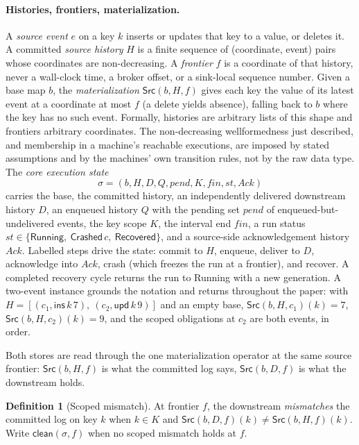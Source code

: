 \documentclass[sigplan,10pt]{acmart}
\theoremstyle{plain}
\theoremstyle{definition}
\newtheorem{definition}{Definition}[section]
\newcommand{\Src}{\mathsf{Src}}            %
\newcommand{\scope}{K}                     %
\newcommand{\fin}{\mathit{fin}}            %
\newcommand{\clean}{\mathsf{clean}}        %
\newcommand{\Running}{\textsf{Running}}
\newcommand{\Crashed}{\textsf{Crashed}}
\newcommand{\Recovered}{\textsf{Recovered}}
\begin{document}
\paragraph{Histories, frontiers, materialization.}
A \emph{source event} $e$ on a key $k$ inserts or updates that key to a
value, or deletes it. A committed \emph{source history} $H$ is a finite
sequence of (coordinate, event) pairs whose coordinates are
non-decreasing. A \emph{frontier} $f$ is a coordinate of that
history, never a wall-clock time, a broker offset, or a sink-local
sequence number. Given a base map $b$, the \emph{materialization}
$\Src(b,H,f)$ gives each key the value of its latest event at a
coordinate at most $f$ (a delete yields absence), falling back to $b$
where the key has no such event. Formally, histories are arbitrary
lists of this shape and frontiers arbitrary coordinates. The
non-decreasing wellformedness just described, and membership in a
machine's reachable executions, are imposed by stated assumptions and by
the machines' own transition rules, not by the raw data type. The
\emph{core execution state}
\[
\sigma = (b, H, D, Q, \mathit{pend}, \scope, \fin, \mathit{st},
\mathit{Ack})
\]
carries the base, the committed history, an independently delivered
downstream history $D$, an enqueued history $Q$ with the pending set
$\mathit{pend}$ of enqueued-but-undelivered events, the key scope
$\scope$, the interval end $\fin$, a run status
$\mathit{st} \in \{\Running,\ \Crashed\,c,\ \Recovered\}$, and a
source-side acknowledgement history $\mathit{Ack}$. Labelled steps
drive the state: commit to $H$, enqueue, deliver to $D$, acknowledge
into $\mathit{Ack}$, crash (which freezes the run at a
frontier), and recover. A completed recovery cycle returns the run to
\Running{} with a new generation. A two-event instance grounds the
notation and returns throughout the paper: with
$H = [(c_1, \mathsf{ins}\,k\,7),\ (c_2, \mathsf{upd}\,k\,9)]$ and an
empty base, $\Src(b,H,c_1)(k) = 7$, $\Src(b,H,c_2)(k) = 9$, and the
scoped obligations at $c_2$ are both events, in order.

Both stores are read through the one materialization operator at the
same source frontier: $\Src(b,H,f)$ is what the committed log says,
$\Src(b,D,f)$ is what the downstream holds.

\begin{definition}[Scoped mismatch]\label{def:mismatch}
At frontier $f$, the downstream \emph{mismatches} the committed log on
key $k$ when $k\in\scope$ and $\Src(b,D,f)(k) \neq \Src(b,H,f)(k)$.
Write $\clean(\sigma,f)$ when no scoped mismatch holds at $f$.
\end{definition}
\end{document}
